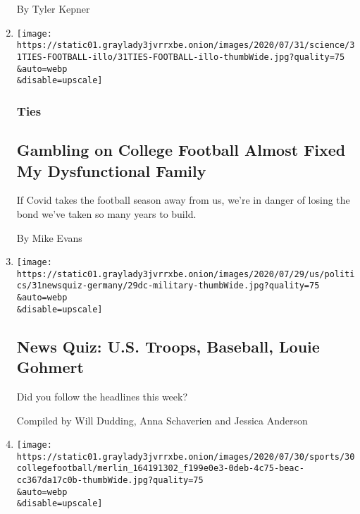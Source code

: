 \begin{enumerate}
  By Tyler Kepner
\item
  \href{/2020/07/31/well/family/gambling-on-college-football-almost-fixed-my-dysfunctional-family.html}{}

  \texttt{[image: https://static01.graylady3jvrrxbe.onion/images/2020/07/31/science/31TIES-FOOTBALL-illo/31TIES-FOOTBALL-illo-thumbWide.jpg?quality=75\\\&auto=webp\\\&disable=upscale]}

  \hypertarget{ties}{%
  \subsubsection{Ties}\label{ties}}

  \hypertarget{gambling-on-college-football-almost-fixed-my-dysfunctional-family}{%
  \subsection{Gambling on College Football Almost Fixed My Dysfunctional
  Family}\label{gambling-on-college-football-almost-fixed-my-dysfunctional-family}}

  If Covid takes the football season away from us, we're in danger of
  losing the bond we've taken so many years to build.

  By Mike Evans
\item
  \href{/interactive/2020/07/31/briefing/troops-baseball-louie-gohmert-news-quiz.html}{}

  \texttt{[image: https://static01.graylady3jvrrxbe.onion/images/2020/07/29/us/politics/31newsquiz-germany/29dc-military-thumbWide.jpg?quality=75\\\&auto=webp\\\&disable=upscale]}

  \hypertarget{news-quiz-us-troops-baseball-louie-gohmert}{%
  \subsection{News Quiz: U.S. Troops, Baseball, Louie
  Gohmert}\label{news-quiz-us-troops-baseball-louie-gohmert}}

  Did you follow the headlines this week?

  Compiled by Will Dudding, Anna Schaverien and Jessica Anderson
\item
  \href{/2020/07/30/sports/coronavirus-sec-schedule.html}{}

  \texttt{[image: https://static01.graylady3jvrrxbe.onion/images/2020/07/30/sports/30collegefootball/merlin\_164191302\_f199e0e3-0deb-4c75-beac-cc367da17c0b-thumbWide.jpg?quality=75\\\&auto=webp\\\&disable=upscale]}


\end{enumerate}
